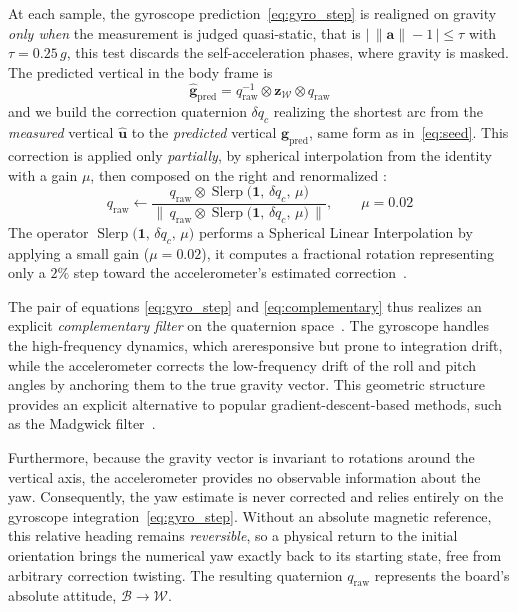 \documentclass{tropLaClasse}
\begin{document}
At each sample, the gyroscope prediction~\eqref{eq:gyro_step} is realigned on gravity \emph{only when} the measurement is judged quasi-static, that is $\big|\,\lVert\mathbf{a}\rVert-1\,\big|\le\tau$ with $\tau=0{.}25\,g$, this test discards the self-acceleration phases, where gravity is masked. The predicted vertical in the body frame is
\begin{equation}
\hat{\mathbf{g}}_{\text{pred}}=q_{\text{raw}}^{-1}\otimes\mathbf{z}_{\mathcal W}\otimes q_{\text{raw}}
\end{equation}
and we build the correction quaternion $\delta q_c$ realizing the shortest arc from the \emph{measured} vertical $\hat{\mathbf{u}}$ to the \emph{predicted} vertical $\hat{\mathbf{g}}_{\text{pred}}$, same form as in~\eqref{eq:seed}. This correction is applied only \emph{partially}, by spherical interpolation from the identity with a gain $\mu$, then composed on the right and renormalized :
\begin{equation}
q_{\text{raw}}\leftarrow\frac{q_{\text{raw}}\otimes\operatorname{Slerp}\!\big(\mathbf{1},\,\delta q_c,\,\mu\big)}{\big\lVert\,q_{\text{raw}}\otimes\operatorname{Slerp}\!\big(\mathbf{1},\,\delta q_c,\,\mu\big)\,\big\rVert},
\qquad \mu=0{.}02
\label{eq:complementary}
\end{equation}
The operator $\operatorname{Slerp}\!\big(\mathbf{1},\,\delta q_c,\,\mu\big)$ performs a Spherical Linear Interpolation by applying a small gain ($\mu = 0.02$), it computes a fractional rotation representing only a $2\%$ step toward the accelerometer's estimated correction~\cite{madgwick2010}.

The pair of equations \eqref{eq:gyro_step} and \eqref{eq:complementary} thus realizes an explicit \emph{complementary filter} on the quaternion space~\cite{mahony2008}. The gyroscope handles the high-frequency dynamics, which areresponsive but prone to integration drift, while the accelerometer corrects the low-frequency drift of the roll and pitch angles by anchoring them to the true gravity vector. This geometric structure provides an explicit alternative to popular gradient-descent-based methods, such as the Madgwick filter~\cite{madgwick2010}.

Furthermore, because the gravity vector is invariant to rotations around the vertical axis, the accelerometer provides no observable information about the yaw. Consequently, the yaw estimate is never corrected and relies entirely on the gyroscope integration~\eqref{eq:gyro_step}. Without an absolute magnetic reference, this relative heading remains \emph{reversible}, so a physical return to the initial orientation brings the numerical yaw exactly back to its starting state, free from arbitrary correction twisting. The resulting quaternion $q_{\text{raw}}$ represents the board's absolute attitude, $\mathcal B\rightarrow\mathcal W$.
\end{document}
